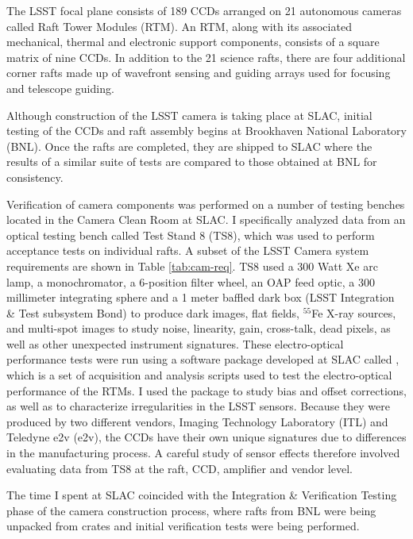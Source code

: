 The LSST focal plane consists of 189 CCDs arranged on 21 autonomous cameras called Raft Tower Modules (RTM). An RTM, along with its associated mechanical, thermal and electronic support components, consists of a square matrix of nine CCDs. In addition to the 21 science rafts, there are four additional corner rafts made up of wavefront sensing and guiding arrays used for focusing and telescope guiding.

Although construction of the LSST camera is taking place at SLAC, initial testing of the CCDs and raft assembly begins at Brookhaven National Laboratory (BNL). Once the rafts are completed, they are shipped to SLAC where the results of a similar suite of tests are compared to those obtained at BNL for consistency.

Verification of camera components was performed on a number of testing benches located in the Camera Clean Room at SLAC. I specifically analyzed data from an optical testing bench called Test Stand 8 (TS8), which was used to perform acceptance tests on individual rafts. A subset of the LSST Camera system requirements are shown in Table \ref{tab:cam-req}. TS8 used a 300 Watt Xe arc lamp, a monochromator, a 6-position filter wheel, an OAP feed optic, a 300 millimeter integrating sphere and a 1 meter baffled dark box (LSST Integration & Test subsystem Bond) to produce dark images, flat fields, $^{55}$Fe X-ray sources, and multi-spot images to study noise, linearity, gain, cross-talk, dead pixels, as well as other unexpected instrument signatures. These electro-optical performance tests were run using a software package developed at SLAC called , which is a set of acquisition and analysis scripts used to test the electro-optical performance of the RTMs.  I used the  package to study bias and offset corrections, as well as to characterize irregularities in the LSST sensors. Because they were produced by two different vendors, Imaging Technology Laboratory (ITL) and Teledyne e2v (e2v), the CCDs have their own unique signatures due to differences in the manufacturing process. A careful study of sensor effects therefore involved evaluating data from TS8 at the raft, CCD, amplifier and vendor level.

The time I spent at SLAC coincided with the Integration \& Verification Testing phase of the camera construction process, where rafts from BNL were being unpacked from crates and initial verification tests were being performed. 

